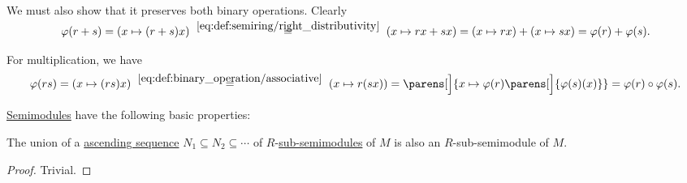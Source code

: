 \begin{defproof}
  We must also show that it preserves both binary operations. Clearly
  \begin{equation*}
    \varphi(r + s)
    =
    (x \mapsto (r + s) x)
    \reloset {\eqref{eq:def:semiring/right_distributivity}} =
    (x \mapsto r x + s x)
    =
    (x \mapsto r x) + (x \mapsto s x)
    =
    \varphi(r) + \varphi(s).
  \end{equation*}

  For multiplication, we have
  \begin{equation*}
    \varphi(rs)
    =
    (x \mapsto (rs)x)
    \reloset {\eqref{eq:def:binary_operation/associative}} =
    (x \mapsto r(sx))
    =
    \parens[\Big]{ x \mapsto \varphi(r)\parens[\Big]{ \varphi(s)(x) } }
    =
    \varphi(r) \bincirc \varphi(s).
  \end{equation*}
\end{defproof}

\begin{proposition}\label{thm:def:semimodule}
  \hyperref[def:semimodule]{Semimodules} have the following basic properties:
  \begin{thmenum}
     The union of a \hyperref[def:order_function/ascending]{ascending sequence} \( N_1 \subseteq N_2 \subseteq \cdots \) of \( R \)-\hyperref[def:semimodule/submodel]{sub-semimodules} of \( M \) is also an \( R \)-sub-semimodule of \( M \).
  \end{thmenum}
\end{proposition}
\begin{proof}
   Trivial.
\end{proof}

